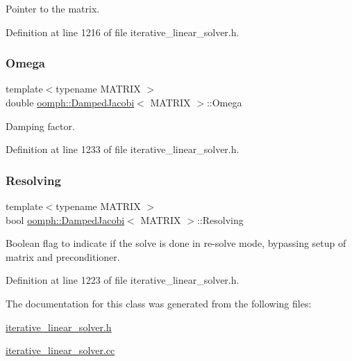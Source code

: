 Pointer to the matrix. 



Definition at line 1216 of file iterative\+\_\+linear\+\_\+solver.\+h.

\mbox{\label{classoomph_1_1DampedJacobi_a7d53a703568479f387f19a5e40837889}} 
\subsubsection{\texorpdfstring{Omega}{Omega}}
{\footnotesize\ttfamily template$<$typename M\+A\+T\+R\+IX $>$ \\
double \hyperlink{classoomph_1_1DampedJacobi}{oomph\+::\+Damped\+Jacobi}$<$ M\+A\+T\+R\+IX $>$\+::Omega\hspace{0.3cm}{\ttfamily [private]}}



Damping factor. 



Definition at line 1233 of file iterative\+\_\+linear\+\_\+solver.\+h.

\mbox{\label{classoomph_1_1DampedJacobi_a096e652907b8451205f909e0277de284}} 
\subsubsection{\texorpdfstring{Resolving}{Resolving}}
{\footnotesize\ttfamily template$<$typename M\+A\+T\+R\+IX $>$ \\
bool \hyperlink{classoomph_1_1DampedJacobi}{oomph\+::\+Damped\+Jacobi}$<$ M\+A\+T\+R\+IX $>$\+::Resolving\hspace{0.3cm}{\ttfamily [private]}}



Boolean flag to indicate if the solve is done in re-\/solve mode, bypassing setup of matrix and preconditioner. 



Definition at line 1223 of file iterative\+\_\+linear\+\_\+solver.\+h.



The documentation for this class was generated from the following files\+:\begin{DoxyCompactItemize}
\item 
\hyperlink{iterative__linear__solver_8h}{iterative\+\_\+linear\+\_\+solver.\+h}\item 
\hyperlink{iterative__linear__solver_8cc}{iterative\+\_\+linear\+\_\+solver.\+cc}\end{DoxyCompactItemize}
